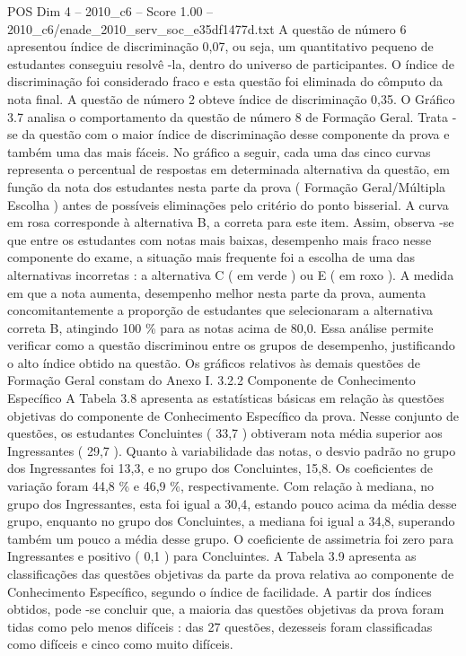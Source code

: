 \begin{textsample}{POS Dim 4 – 2010\_c6 – Score 1.00 – 2010\_c6/enade\_2010\_serv\_soc\_e35df1477d.txt}
A questão de número 6 apresentou índice de discriminação 0,07, ou seja, um quantitativo pequeno de estudantes conseguiu resolvê -la, dentro do universo de participantes.
O índice de discriminação foi considerado fraco e esta questão foi eliminada do cômputo da nota final.
A questão de número 2 obteve índice de discriminação 0,35.
O Gráfico 3.7 analisa o comportamento da questão de número 8 de Formação Geral.
Trata -se da questão com o maior índice de discriminação desse componente da prova e também uma das mais fáceis.
No gráfico a seguir, cada uma das cinco curvas representa o percentual de respostas em determinada alternativa da questão, em função da nota dos estudantes nesta parte da prova ( Formação Geral/Múltipla Escolha ) antes de possíveis eliminações pelo critério do ponto bisserial.
A curva em rosa corresponde à alternativa B, a correta para este item.
Assim, observa -se que entre os estudantes com notas mais baixas, desempenho mais fraco nesse componente do exame, a situação mais frequente foi a escolha de uma das alternativas incorretas : a alternativa C ( em verde ) ou E ( em roxo ).
A medida em que a nota aumenta, desempenho melhor nesta parte da prova, aumenta concomitantemente a proporção de estudantes que selecionaram a alternativa correta B, atingindo 100 \% para as notas acima de 80,0.
Essa análise permite verificar como a questão discriminou entre os grupos de desempenho, justificando o alto índice obtido na questão.
Os gráficos relativos às demais questões de Formação Geral constam do Anexo I. 3.2.2 Componente de Conhecimento Específico A Tabela 3.8 apresenta as estatísticas básicas em relação às questões objetivas do componente de Conhecimento Específico da prova.
Nesse conjunto de questões, os estudantes Concluintes ( 33,7 ) obtiveram nota média superior aos Ingressantes ( 29,7 ).
Quanto à variabilidade das notas, o desvio padrão no grupo dos Ingressantes foi 13,3, e no grupo dos Concluintes, 15,8.
Os coeficientes de variação foram 44,8 \% e 46,9 \%, respectivamente.
Com relação à mediana, no grupo dos Ingressantes, esta foi igual a 30,4, estando pouco acima da média desse grupo, enquanto no grupo dos Concluintes, a mediana foi igual a 34,8, superando também um pouco a média desse grupo.
O coeficiente de assimetria foi zero para Ingressantes e positivo ( 0,1 ) para Concluintes.
A Tabela 3.9 apresenta as classificações das questões objetivas da parte da prova relativa ao componente de Conhecimento Específico, segundo o índice de facilidade.
A partir dos índices obtidos, pode -se concluir que, a maioria das questões objetivas da prova foram tidas como pelo menos difíceis : das 27 questões, dezesseis foram classificadas como difíceis e cinco como muito difíceis.

\end{textsample}
